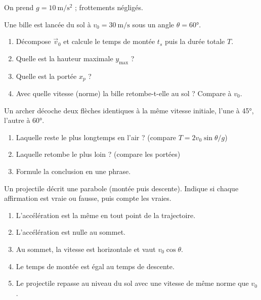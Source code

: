 \documentclass[11pt,a4paper]{article}
\newcommand{\vv}[1]{\vec{#1}}\newcommand{\ds}{\displaystyle}
\begin{document}
On prend $g=\qty{10}{\metre\per\second\squared}$ ; frottements négligés.

\begin{exo}
Une bille est lancée du sol à $v_0=\qty{30}{\metre\per\second}$ sous un angle $\theta=\ang{60}$.
\begin{enumerate}[label=\alph*)]
  \item Décompose $\vv{v}_0$ et calcule le temps de montée $t_s$ puis la durée totale $T$.
  \item Quelle est la hauteur maximale $y_{\max}$ ?
  \item Quelle est la portée $x_p$ ?
  \item Avec quelle vitesse (norme) la bille retombe-t-elle au sol ? Compare à $v_0$.
\end{enumerate}
\end{exo}

\begin{exo}[l'archer : 45° ou 60° ?]
Un archer décoche deux flèches identiques à la même vitesse initiale, l'une à \ang{45}, l'autre à \ang{60}.
\begin{enumerate}[label=\alph*)]
  \item Laquelle reste le plus longtemps en l'air ? (compare $T=2v_0\sin\theta/g$)
  \item Laquelle retombe le plus loin ? (compare les portées)
  \item Formule la conclusion en une phrase.
\end{enumerate}
\end{exo}

\begin{exo}
Un projectile décrit une parabole (montée puis descente). Indique si chaque affirmation est vraie ou fausse, puis compte les vraies.
\begin{enumerate}[label=\alph*)]
  \item L'accélération est la même en tout point de la trajectoire.
  \item L'accélération est nulle au sommet.
  \item Au sommet, la vitesse est horizontale et vaut $v_0\cos\theta$.
  \item Le temps de montée est égal au temps de descente.
  \item Le projectile repasse au niveau du sol avec une vitesse de même norme que $v_0$.
\end{enumerate}
\end{exo}
\end{document}
